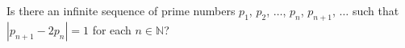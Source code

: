 Is there an infinite sequence of prime numbers $p_1$,  $p_2$,  $\ldots$,  $p_n$,  $p_{n+1}$,  $\ldots$ such that $|p_{n+1}-2p_n|=1$ for each $n \in \mathbb{N}$?